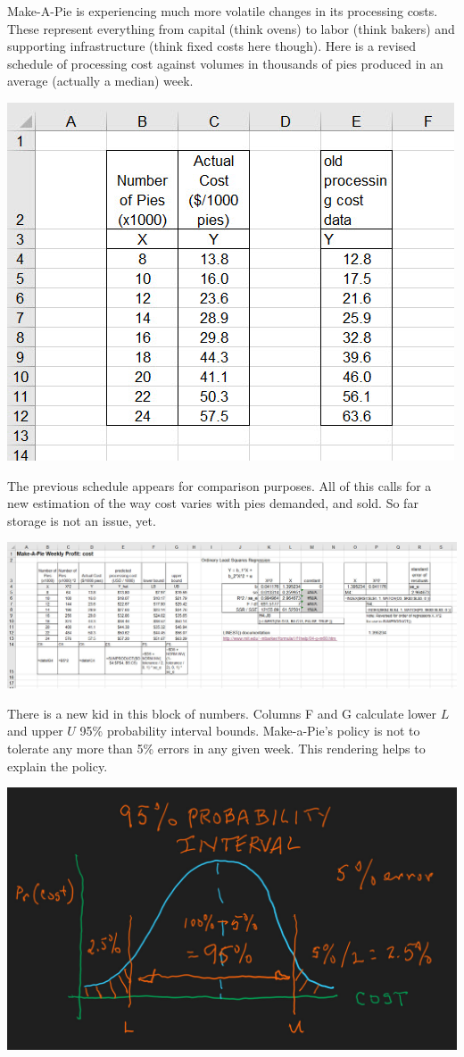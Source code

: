 \documentclass[
]{book}
\begin{document}
Make-A-Pie is experiencing much more volatile changes in its processing costs. These represent everything from capital (think ovens) to labor (think bakers) and supporting infrastructure (think fixed costs here though). Here is a revised schedule of processing cost against volumes in thousands of pies produced in an average (actually a median) week.

\includegraphics{images/02/pie-data-cost.jpg}

The previous schedule appears for comparison purposes. All of this calls for a new estimation of the way cost varies with pies demanded, and sold. So far storage is not an issue, yet.

\includegraphics{images/02/pie-cost-estimation.jpg}

There is a new kid in this block of numbers. Columns F and G calculate lower \(L\) and upper \(U\) 95\% probability interval bounds. Make-a-Pie's policy is not to tolerate any more than 5\% errors in any given week. This rendering helps to explain the policy.

\includegraphics{images/02/pie-cost-prob-interval.jpg}
\end{document}
